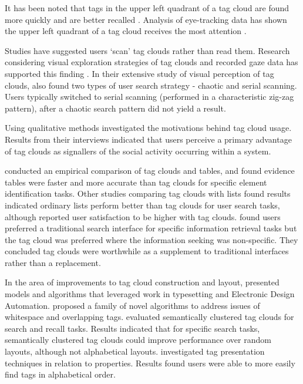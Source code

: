 It has been noted that tags in the upper left quadrant of a tag cloud are found more quickly \citep{bateman08} and are better recalled \citep{rivadeneira07}. Analysis of eye-tracking data has shown the upper left quadrant of a tag cloud receives the most attention \citep[][]{lohmann09, schrammel09b}. 

Studies \citep[such as][]{halvey07, bateman08} have suggested users `scan' tag clouds rather than read them.  Research considering visual exploration strategies of tag clouds and recorded gaze data has supported this finding \citep[][]{lohmann09, schrammel09b}. In their extensive study of visual perception of tag clouds, \citet{schrammel09b} also found two types of user search strategy - chaotic and serial scanning. Users typically switched to serial scanning (performed in a characteristic zig-zag pattern), after a chaotic search pattern did not yield a result.

Using qualitative methods \citet{hearst08} investigated the motivations behind tag cloud usage. Results from their interviews indicated that users perceive a primary advantage of tag clouds as signallers of the social activity occurring within a system.

\citet{Oosterman10} conducted an empirical comparison of tag clouds and tables, and found evidence tables were faster and more accurate than tag clouds for specific element identification tasks. Other studies comparing tag clouds with lists \citep{halvey07, rivadeneira07, kuo07} found results indicated ordinary lists perform better than tag clouds for user search tasks, although \citet{kuo07} reported user satisfaction to be higher with tag clouds. \citet{sinclair08} found users preferred a traditional search interface for specific information retrieval tasks but the tag cloud was preferred where the information seeking was non-specific. They concluded tag clouds were worthwhile as a supplement to traditional interfaces rather than a replacement.

In the area of improvements to tag cloud construction and layout, \citet{kaser07} presented models and algorithms that leveraged work in typesetting and Electronic Design Automation. \citet{seifert08} proposed a family of novel algorithms to address issues of whitespace and overlapping tags. \citet{schrammel09} evaluated semantically clustered tag clouds for search and recall tasks. Results indicated that for specific search tasks, semantically clustered tag clouds could improve performance over random layouts, although not alphabetical layouts. \citet{halvey07} investigated tag presentation techniques in relation to properties. Results found users were able to more easily find tags in alphabetical order. 

